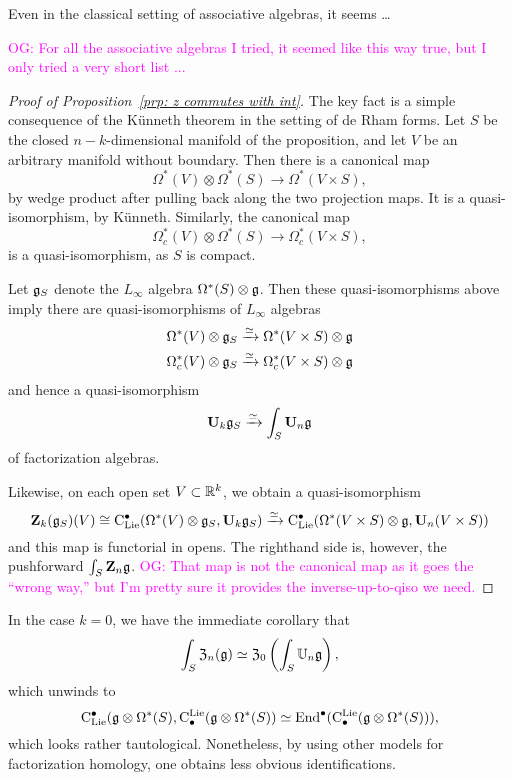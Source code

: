 \documentclass[11pt]{amsart}
\numberwithin{equation}{section}
\def\owen{\textcolor{magenta}{OG: }\textcolor{magenta}}
\begin{document}
Even in the classical setting of associative algebras, it seems \dots

\owen{For all the associative algebras I tried, it seemed like this way true, but I only tried a very short list ...}

\begin{proof}[Proof of Proposition~\ref{prp: z commutes with int}]
The key fact is a simple consequence of the K\"unneth theorem in the setting of de Rham forms.
Let $S$ be the closed $n-k$-dimensional manifold of the proposition,
and let $V$ be an arbitrary manifold without boundary.
Then there is a canonical map
\[
\Omega^*(V) \otimes \Omega^*(S) \to \Omega^*(V \times S),
\]
by wedge product after pulling back along the two projection maps.
It is a quasi-isomorphism, by K\"unneth.
Similarly, the canonical map
\[
\Omega_c^*(V) \otimes \Omega^*(S) \to \Omega_c^*(V \times S),
\]
is a quasi-isomorphism, as $S$ is compact.

Let $\mathfrak g_S$ denote the $L_\infty$ algebra $\Omega^*(S) \otimes \mathfrak g$. 
Then these quasi-isomorphisms above imply there are quasi-isomorphisms of $L_\infty$ algebras
\begin{align*}
\Omega^*(V) \otimes \mathfrak g_S &\xrightarrow{\simeq} \Omega^*(V \times S) \otimes \mathfrak g \\
\Omega_c^*(V) \otimes \mathfrak g_S &\xrightarrow{\simeq} \Omega_c^*(V \times S) \otimes \mathfrak g 
\end{align*}
and hence a quasi-isomorphism
\[
\mathbf U_k \mathfrak g_S \xrightarrow{\simeq} \int_S \mathbf U_n \mathfrak g
\]
of factorization algebras.

Likewise, on each open set $V \subset \mathbb R^k$, 
we obtain a quasi-isomorphism
\[
\mathbf Z_k(\mathfrak g_S)(V) \cong {\rm C}_{\rm Lie}^\bullet( \Omega^*(V) \otimes \mathfrak g_S, \mathbf U_k \mathfrak g_S) \xrightarrow{\simeq} {\rm C}_{\rm Lie}^\bullet(\Omega^*(V \times S) \otimes \mathfrak g, \mathbf U_n(V \times S))
\]
and this map is functorial in opens.
The righthand side is, however, the pushforward $\int_S \mathbf Z_n \mathfrak g$.
\owen{That map is not the canonical map as it goes the ``wrong way,'' but I'm pretty sure it provides the inverse-up-to-qiso we need.}
\end{proof}

In the case $k = 0$, we have the immediate corollary that
\[
\int_{S} \mathfrak Z_n(\mathfrak g) \simeq \mathfrak Z_0 \left( \int_S \mathbb U_n \mathfrak g \right) ,
\]
which unwinds to 
\[
{\rm C}_{\rm Lie}^\bullet(\mathfrak g \otimes \Omega^*(S), {\rm C}^{\rm Lie}_\bullet(\mathfrak g \otimes \Omega^*(S)) \simeq {\rm End}^\bullet({\rm C}^{\rm Lie}_\bullet(\mathfrak g \otimes \Omega^*(S))),
\]
which looks rather tautological.
Nonetheless, by using other models for factorization homology,
one obtains less obvious identifications.
\end{document}
